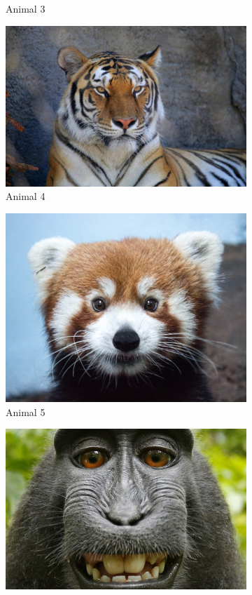 \documentclass[12pt]{article}
\begin{document}
\begin{figure}
\begin{subfigure}{0.49\linewidth}
    \caption{Animal 3}
    \label{fig:animal3}
    \end{subfigure}
    \begin{subfigure}{0.49\linewidth}
    \centering
    \includegraphics[width=0.7\linewidth]{animals/animal4.jpg}
    \caption{Animal 4}
    \label{fig:animal4}
    \end{subfigure}
    \begin{subfigure}{0.49\linewidth}
    \centering
    \includegraphics[width=0.7\linewidth]{animals/animal5.jpg}
    \caption{Animal 5}
    \label{fig:animal5}
    \end{subfigure}
    \begin{subfigure}{0.49\linewidth}
    \centering
    \includegraphics[width=0.7\linewidth]{animals/animal6.jpg}

\end{subfigure}
\end{figure}
\end{document}
